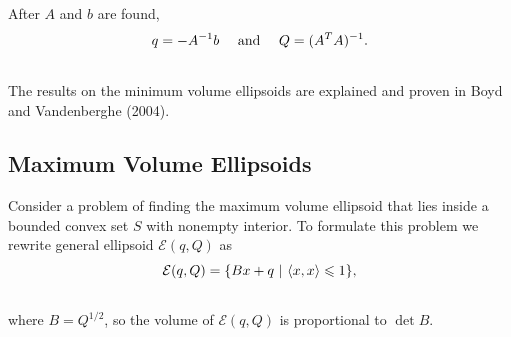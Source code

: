 \documentclass[letterpaper,10pt,english]{sphinxmanual}
\begin{document}
After $A$ and $b$ are found,
\begin{gather}
\begin{split}q=-A^{-1}b ~~~ \mbox{ and } ~~~ Q=(A^TA)^{-1}.\end{split}\notag\\\begin{split}\end{split}\notag
\end{gather}
The results on the minimum volume ellipsoids are explained and proven in
Boyd and Vandenberghe (2004).


\subsection{Maximum Volume Ellipsoids}
\label{chap_ellcalc:maximum-volume-ellipsoids}
Consider a problem of finding the maximum volume ellipsoid that lies
inside a bounded convex set $S$ with nonempty interior. To
formulate this problem we rewrite general ellipsoid
${\mathcal E}(q,Q)$ as
\begin{gather}
\begin{split}{\mathcal E}(q,Q) = \{Bx + q ~|~ \langle x,x\rangle\leqslant1\},\end{split}\notag\\\begin{split}\end{split}\notag
\end{gather}
where $B=Q^{1/2}$, so the volume of ${\mathcal E}(q,Q)$ is
proportional to $\det B$.
\end{document}
